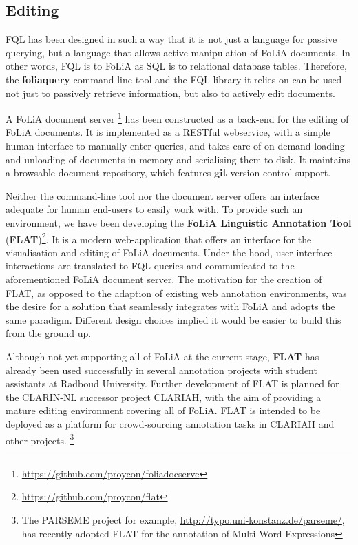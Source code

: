 \documentclass[a4paper,11pt]{article}
\begin{document}
\subsection{Editing}

FQL has been designed in such a way that it is not just a language for passive
querying, but a language that allows active manipulation of FoLiA documents. In
other words, FQL is to FoLiA as SQL is to relational database tables.
Therefore, the \textbf{foliaquery} command-line tool and the FQL library it relies on
can be used not just to passively retrieve information, but also to actively
edit documents.

A FoLiA document server \footnote{\url{https://github.com/proycon/foliadocserve}} has
been constructed as a back-end for the editing of FoLiA documents. It is
implemented as a RESTful webservice, with a simple human-interface to manually
enter queries, and takes care of on-demand loading and unloading of documents in
memory and serialising them to disk. It maintains a browsable document
repository, which features \textbf{git} version control support.

Neither the command-line tool nor the document server offers an interface
adequate for human end-users to easily work with. To provide such an
environment, we have been developing the \textbf{FoLiA Linguistic Annotation
Tool} (\textbf{FLAT})\footnote{\url{https://github.com/proycon/flat}}. It is a
modern web-application that offers an interface for the visualisation and
editing of FoLiA documents. Under the hood, user-interface interactions are
translated to FQL queries and communicated to the aforementioned FoLiA document
server. The motivation for the creation of FLAT, as opposed to the adaption of
existing web annotation environments, was the desire for a solution that
seamlessly integrates with FoLiA and adopts the same paradigm. Different design
choices implied it would be easier to build this from the ground up.

Although not yet supporting all of FoLiA at the current stage, \textbf{FLAT}
has already been used successfully in several annotation projects with
student assistants at Radboud University. Further development of FLAT is
planned for the CLARIN-NL successor project CLARIAH, with the aim of providing
a mature editing environment covering all of FoLiA. FLAT is intended to be
deployed as a platform for crowd-sourcing annotation tasks in CLARIAH and other
projects. \footnote{The PARSEME project for example,
\url{http://typo.uni-konstanz.de/parseme/}, has recently adopted FLAT for the
annotation of Multi-Word Expressions}
\end{document}
